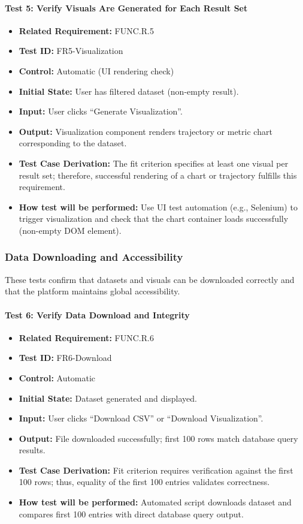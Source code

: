 \documentclass[12pt, titlepage]{article}
\begin{document}
\paragraph{Test 5: Verify Visuals Are Generated for Each Result Set}
\begin{itemize}
    \item \textbf{Related Requirement:} FUNC.R.5
    \item \textbf{Test ID:} FR5-Visualization
    \item \textbf{Control:} Automatic (UI rendering check)
    \item \textbf{Initial State:} User has filtered dataset (non-empty result).
    \item \textbf{Input:} User clicks ``Generate Visualization''.
    \item \textbf{Output:} Visualization component renders trajectory or metric chart corresponding to the dataset.
    \item \textbf{Test Case Derivation:} The fit criterion specifies at least one visual per result set; therefore, successful rendering of a chart or trajectory fulfills this requirement.
    \item \textbf{How test will be performed:} Use UI test automation (e.g., Selenium) to trigger visualization and check that the chart container loads successfully (non-empty DOM element).
\end{itemize}

\subsubsection{Data Downloading and Accessibility}

These tests confirm that datasets and visuals can be downloaded correctly and that the platform maintains global accessibility.

\paragraph{Test 6: Verify Data Download and Integrity}
\begin{itemize}
    \item \textbf{Related Requirement:} FUNC.R.6
    \item \textbf{Test ID:} FR6-Download
    \item \textbf{Control:} Automatic
    \item \textbf{Initial State:} Dataset generated and displayed.
    \item \textbf{Input:} User clicks ``Download CSV'' or ``Download Visualization''.
    \item \textbf{Output:} File downloaded successfully; first 100 rows match database query results.
    \item \textbf{Test Case Derivation:} Fit criterion requires verification against the first 100 rows; thus, equality of the first 100 entries validates correctness.
    \item \textbf{How test will be performed:} Automated script downloads dataset and compares first 100 entries with direct database query output.
\end{itemize}
\end{document}
